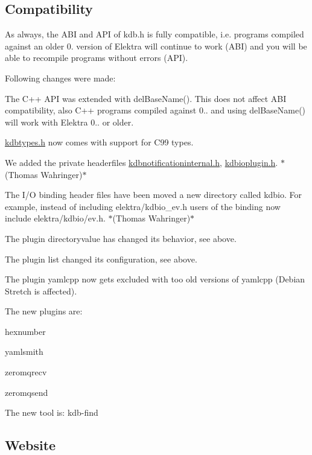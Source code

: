 \subsection*{Compatibility}

As always, the A\+BI and A\+PI of kdb.\+h is fully compatible, i.\+e. programs compiled against an older 0. version of Elektra will continue to work (A\+BI) and you will be able to recompile programs without errors (A\+PI).

Following changes were made\+:


\begin{DoxyItemize}
\item The C++ A\+PI was extended with {\ttfamily del\+Base\+Name()}. This does not affect A\+BI compatibility, also C++ programs compiled against 0.. and using {\ttfamily del\+Base\+Name()} will work with Elektra 0.. or older.
\item {\ttfamily \hyperlink{kdbtypes_8h}{kdbtypes.\+h}} now comes with support for C99 types.
\item We added the private headerfiles {\ttfamily \hyperlink{kdbnotificationinternal_8h}{kdbnotificationinternal.\+h}}, {\ttfamily \hyperlink{kdbioplugin_8h}{kdbioplugin.\+h}}. $\ast$(Thomas Wahringer)$\ast$
\item The I/O binding header files have been moved a new directory called {\ttfamily kdbio}. For example, instead of including {\ttfamily elektra/kdbio\+\_\+ev.\+h} users of the binding now include {\ttfamily elektra/kdbio/ev.\+h}. $\ast$(Thomas Wahringer)$\ast$
\item The plugin directoryvalue has changed its behavior, see above.
\item The plugin list changed its configuration, see above.
\item The plugin yamlcpp now gets excluded with too old versions of yamlcpp (Debian Stretch is affected).
\end{DoxyItemize}

The new plugins are\+:


\begin{DoxyItemize}
\item hexnumber
\item yamlsmith
\item zeromqrecv
\item zeromqsend
\end{DoxyItemize}

The new tool is\+: kdb-\/find

\subsection*{Website}


